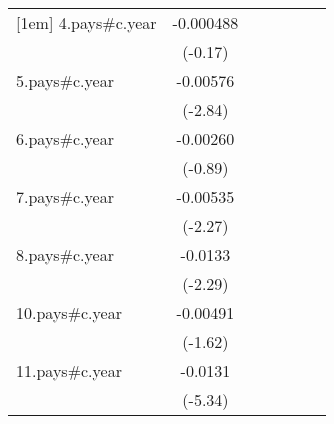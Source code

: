 {\begin{tabular}{l*{6}{c}}
[1em]
4.pays#c.year       &   -0.000488         &                     &                     &                     &                     &                     \\
                    &     (-0.17)         &                     &                     &                     &                     &                     \\
[1em]
5.pays#c.year       &    -0.00576\sym{**} &                     &                     &                     &                     &                     \\
                    &     (-2.84)         &                     &                     &                     &                     &                     \\
[1em]
6.pays#c.year       &    -0.00260         &                     &                     &                     &                     &                     \\
                    &     (-0.89)         &                     &                     &                     &                     &                     \\
[1em]
7.pays#c.year       &    -0.00535\sym{*}  &                     &                     &                     &                     &                     \\
                    &     (-2.27)         &                     &                     &                     &                     &                     \\
[1em]
8.pays#c.year       &     -0.0133\sym{*}  &                     &                     &                     &                     &                     \\
                    &     (-2.29)         &                     &                     &                     &                     &                     \\
[1em]
10.pays#c.year      &    -0.00491         &                     &                     &                     &                     &                     \\
                    &     (-1.62)         &                     &                     &                     &                     &                     \\
[1em]
11.pays#c.year      &     -0.0131\sym{***}&                     &                     &                     &                     &                     \\
                    &     (-5.34)         &                     &                     &                     &                     &                     \\

\end{tabular}}
